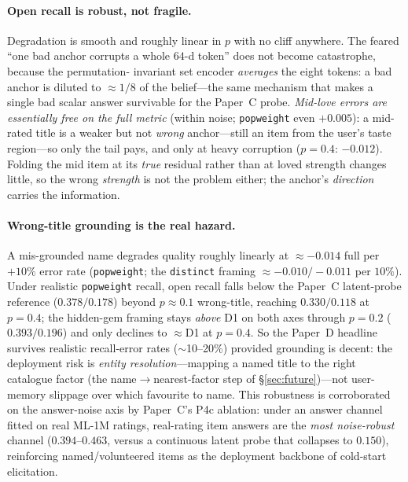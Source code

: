 \documentclass[11pt]{article}
\begin{document}
\paragraph{Open recall is robust, not fragile.} Degradation is smooth and roughly linear in $p$ with no cliff anywhere.
The feared ``one bad anchor corrupts a whole $64$-d token'' does not become catastrophe, because the permutation-
invariant set encoder \emph{averages} the eight tokens: a bad anchor is diluted to $\approx 1/8$ of the belief---the same
mechanism that makes a single bad scalar answer survivable for the Paper~C probe. \emph{Mid-love errors are essentially
free on the full metric} (within noise; \texttt{popweight} even $+0.005$): a mid-rated title is a weaker but not
\emph{wrong} anchor---still an item from the user's taste region---so only the tail pays, and only at heavy corruption
($p{=}0.4$: $-0.012$). Folding the mid item at its \emph{true} residual rather than at loved strength changes little, so
the wrong \emph{strength} is not the problem either; the anchor's \emph{direction} carries the information.

\paragraph{Wrong-title grounding is the real hazard.} A mis-grounded name degrades quality roughly linearly at
$\approx -0.014$ full per $+10\%$ error rate (\texttt{popweight}; the \texttt{distinct} framing $\approx
-0.010/-0.011$ per $10\%$). Under realistic \texttt{popweight} recall, open recall falls below the Paper~C latent-probe
reference ($0.378/0.178$) beyond $p\approx0.1$ wrong-title, reaching $0.330/0.118$ at $p{=}0.4$; the hidden-gem framing
stays \emph{above} D1 on both axes through $p{=}0.2$ ($0.393/0.196$) and only declines to $\approx$D1 at $p{=}0.4$. So
the Paper~D headline survives realistic recall-error rates ($\sim$10--20\%) provided grounding is decent: the deployment
risk is \emph{entity resolution}---mapping a named title to the right catalogue factor (the name$\to$nearest-factor step
of \S\ref{sec:future})---not user-memory slippage over which favourite to name. This robustness is corroborated on the
answer-noise axis by Paper~C's P4c ablation: under an answer channel fitted on real ML-1M ratings, real-rating item
answers are the \emph{most noise-robust} channel ($0.394$--$0.463$, versus a continuous latent probe that collapses to
$0.150$), reinforcing named/volunteered items as the deployment backbone of cold-start elicitation.
\end{document}
